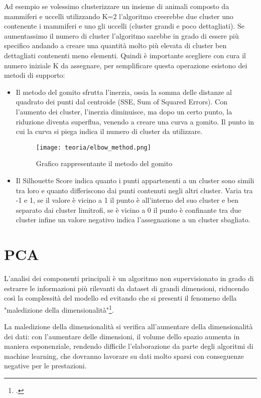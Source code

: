Ad esempio se volessimo clusterizzare un insieme di animali composto da mammiferi e uccelli utilizzando K=2 l'algoritmo creerebbe due cluster uno contenente i mammiferi e uno gli uccelli (cluster grandi e poco dettagliati).
Se aumentassimo il numero di cluster l'algoritmo sarebbe in grado di essere più specifico andando a creare una quantità molto più elevata di cluster ben dettagliati contenenti meno elementi.
Quindi è importante scegliere con cura il numero iniziale K da assegnare, per semplificare questa operazione esistono dei metodi di supporto:
\begin{itemize}
    \item Il metodo del gomito sfrutta l’inerzia, ossia la somma delle distanze al quadrato dei punti dal centroide (SSE, Sum of Squared Errors). Con l'aumento dei cluster, l’inerzia diminuisce, ma dopo un certo punto, la riduzione diventa superflua, venendo a creare una curva a gomito. Il punto in cui la curva si piega indica il numero di cluster da utilizzare.
    
    \begin{figure}[!h] 
        \centering 
        \texttt{[image: teoria/elbow\_method.png]} 
        \caption{Grafico rappresentante il metodo del gomito}
        \label{fig:gomito}
      \end{figure}

    \item Il Silhouette Score indica quanto i punti appartenenti a un cluster sono simili tra loro e quanto differiscono dai punti contenuti negli altri cluster.
    Varia tra -1 e 1, se il valore è vicino a 1 il punto è all'interno del suo cluster e ben separato dai cluster limitrofi, se è vicino a 0 il punto è confinante tra due cluster infine un valore negativo indica l'assegnazione a un cluster sbagliato.
\end{itemize}

\section{PCA}
L'analisi dei componenti principali è un algoritmo non supervisionato in grado di estrarre le informazioni più rilevanti da dataset di grandi dimensioni, riducendo così la complessità del modello ed evitando che si presenti il fenomeno della "maledizione della dimensionalità"\footcite{site:PCA}.

La maledizione della dimensionalità si verifica all'aumentare della dimensionalità dei dati: con l'aumentare delle dimensioni, il volume dello spazio aumenta in maniera esponenziale, rendendo difficile l'elaborazione da parte degli algoritmi di machine learning, che dovranno lavorare su dati molto sparsi con conseguenze negative per le prestazioni.

